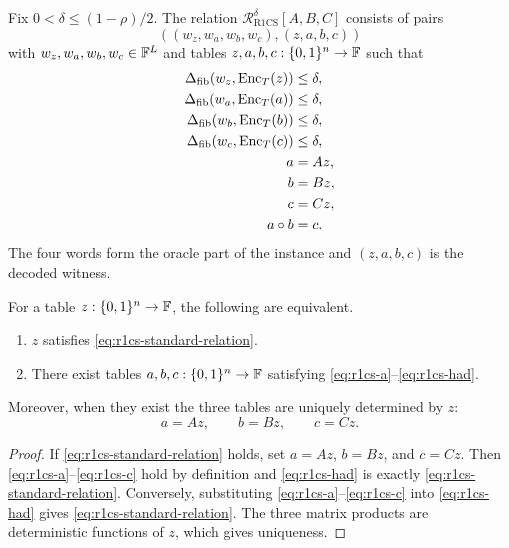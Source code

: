 \begin{definition}
\label{def:r1cs-relation}
Fix $0<\delta\le(1-\rho)/2$.  The relation
$\mathcal R^{\delta}_{\mathrm{R1CS}}[A,B,C]$ consists of pairs
\[
  ((w_z,w_a,w_b,w_c),(z,a,b,c))
\]
with $w_z,w_a,w_b,w_c\in\mathbb{F}^L$ and tables $z,a,b,c:\{0,1\}^n\to\mathbb{F}$ such that
\begin{align}
  \Delta_{\mathrm{fib}}(w_z,\operatorname{Enc}_T(z))&\le\delta,
  \label{eq:r1cs-distance-z}\\
  \Delta_{\mathrm{fib}}(w_a,\operatorname{Enc}_T(a))&\le\delta,
  \label{eq:r1cs-distance-a}\\
  \Delta_{\mathrm{fib}}(w_b,\operatorname{Enc}_T(b))&\le\delta,
  \label{eq:r1cs-distance-b}\\
  \Delta_{\mathrm{fib}}(w_c,\operatorname{Enc}_T(c))&\le\delta,
  \label{eq:r1cs-distance-c}\\
  a&=Az,
  \label{eq:r1cs-a}\\
  b&=Bz,
  \label{eq:r1cs-b}\\
  c&=Cz,
  \label{eq:r1cs-c}\\
  a\circ b&=c.
  \label{eq:r1cs-had}
\end{align}
The four words form the oracle part of the instance and $(z,a,b,c)$ is the decoded witness.
\end{definition}

\begin{proposition}
\label{prop:r1cs-equivalence}
For a table $z:\{0,1\}^n\to\mathbb{F}$, the following are equivalent.
\begin{enumerate}[label=(\roman*),leftmargin=*]
  \item $z$ satisfies \eqref{eq:r1cs-standard-relation}.
  \item There exist tables $a,b,c:\{0,1\}^n\to\mathbb{F}$ satisfying \eqref{eq:r1cs-a}--\eqref{eq:r1cs-had}.
\end{enumerate}
Moreover, when they exist the three tables are uniquely determined by $z$:
\[
  a=Az,\qquad b=Bz,\qquad c=Cz.
\]
\end{proposition}

\begin{proof}
If \eqref{eq:r1cs-standard-relation} holds, set $a=Az$, $b=Bz$, and $c=Cz$.  Then \eqref{eq:r1cs-a}--\eqref{eq:r1cs-c} hold by definition and \eqref{eq:r1cs-had} is exactly \eqref{eq:r1cs-standard-relation}.  Conversely, substituting \eqref{eq:r1cs-a}--\eqref{eq:r1cs-c} into \eqref{eq:r1cs-had} gives \eqref{eq:r1cs-standard-relation}.  The three matrix products are deterministic functions of $z$, which gives uniqueness.
\end{proof}

